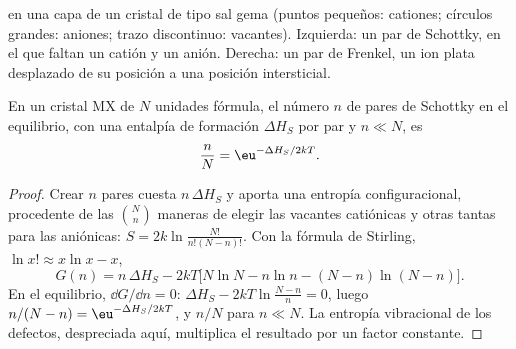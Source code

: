 \begin{omfigure}

{\small {} en una capa de un cristal de tipo sal gema (puntos pequeños: cationes;
círculos grandes: aniones; trazo discontinuo: vacantes). Izquierda: un par de Schottky, en el que faltan un catión
y un anión. Derecha: un par de Frenkel, un ion plata desplazado de su posición
a una posición intersticial.}
\end{omfigure}

\begin{theorem}\label{thm:b3:solid-state:schottky}
En un cristal MX de $N$ unidades fórmula, el número $n$ de pares de Schottky en el
equilibrio, con una entalpía de formación $\Delta H_S$ por par y $n \ll N$, es
\[
  \frac{n}{N} = \eu^{-\Delta H_S/2kT}.
\]
\end{theorem}

\begin{proof}
Crear $n$ pares cuesta $n\,\Delta H_S$ y aporta una entropía configuracional, procedente de las
$\binom{N}{n}$ maneras de elegir las vacantes catiónicas y otras tantas para las aniónicas:
$S = 2k\ln\frac{N!}{n!(N - n)!}$. Con la fórmula de Stirling, $\ln x! \approx x\ln x - x$,
\[
  G(n) = n\,\Delta H_S - 2kT\bigl[N\ln N - n\ln n - (N - n)\ln(N - n)\bigr].
\]
En el equilibrio, $\dd G/\dd n = 0$: $\Delta H_S - 2kT\ln\frac{N - n}{n} = 0$, luego $n/(N - n) = \eu^{-\Delta H_S/2kT}$, y $n/N$ para
$n \ll N$. La entropía vibracional de los defectos, despreciada aquí, multiplica el
resultado por un factor constante.
\end{proof}

